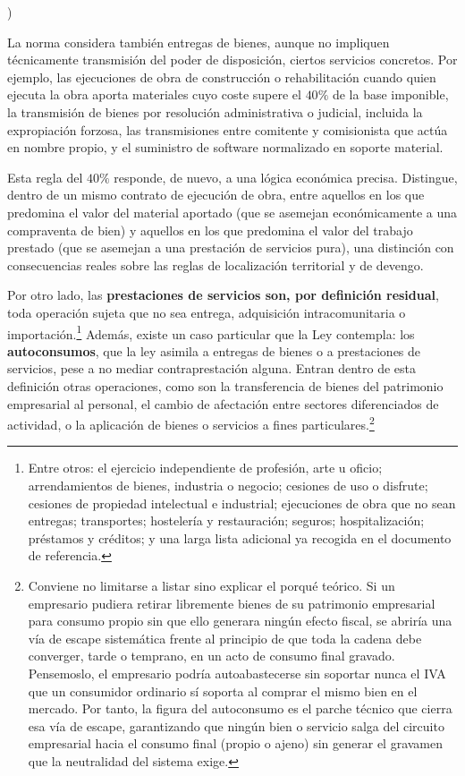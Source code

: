 \documentclass[10pt,a4paper]{article}
\newcounter{alphaitem}
\newenvironment{la}
      {\begin{list}{\alph{alphaitem})}{%
          \usecounter{alphaitem}%
          \setlength{\leftmargin}{1cm}%
          \setlength{\parskip}{3pt}%
          \setlength{\itemsep}{0pt}%
          \setlength{\parsep}{0pt}%
      }}
      {\end{list}}
\begin{document}
\begin{la}
{        La norma considera también entregas de bienes, aunque no impliquen técnicamente transmisión del poder de disposición, ciertos servicios concretos. Por ejemplo, las ejecuciones de obra de construcción o rehabilitación cuando quien ejecuta la obra aporta materiales cuyo coste supere el $40\%$ de la base imponible, la transmisión de bienes por resolución administrativa o judicial, incluida la expropiación forzosa, las transmisiones entre comitente y comisionista que actúa en nombre propio, y el suministro de software normalizado en soporte material. 
    
    Esta regla del $40\%$ responde, de nuevo, a una lógica económica precisa. Distingue, dentro de un mismo contrato de ejecución de obra, entre aquellos en los que predomina el valor del material aportado (que se asemejan económicamente a una compraventa de bien) y aquellos en los que predomina el valor del trabajo prestado (que se asemejan a una prestación de servicios pura), una distinción con consecuencias reales sobre las reglas de localización territorial y de devengo.
    } Por otro lado, las \textbf{prestaciones de servicios son, por definición residual}, toda operación sujeta que no sea entrega, adquisición intracomunitaria o importación.\footnote{%
        Entre otros: el ejercicio independiente de profesión, arte u oficio; arrendamientos de bienes, industria o negocio; cesiones de uso o disfrute; cesiones de propiedad intelectual e industrial; ejecuciones de obra que no sean entregas; transportes; hostelería y restauración; seguros; hospitalización; préstamos y créditos; y una larga lista adicional ya recogida en el documento de referencia.
    } Además, existe un caso particular que la Ley contempla: los \textbf{autoconsumos}, que la ley asimila a entregas de bienes o a prestaciones de servicios, pese a no mediar contraprestación alguna. Entran dentro de esta definición otras operaciones, como son la transferencia de bienes del patrimonio empresarial al personal, el cambio de afectación entre sectores diferenciados de actividad, o la aplicación de bienes o servicios a fines particulares.\footnote{%
        Conviene no limitarse a listar sino explicar el porqué teórico. Si un empresario pudiera retirar libremente bienes de su patrimonio empresarial para consumo propio sin que ello generara ningún efecto fiscal, se abriría una vía de escape sistemática frente al principio de que toda la cadena debe converger, tarde o temprano, en un acto de consumo final gravado. Pensemoslo, el empresario podría autoabastecerse sin soportar nunca el IVA que un consumidor ordinario sí soporta al comprar el mismo bien en el mercado. Por tanto, la figura del autoconsumo es el parche técnico que cierra esa vía de escape, garantizando que ningún bien o servicio salga del circuito empresarial hacia el consumo final (propio o ajeno) sin generar el gravamen que la neutralidad del sistema exige.
    }
\end{la}
\end{document}
